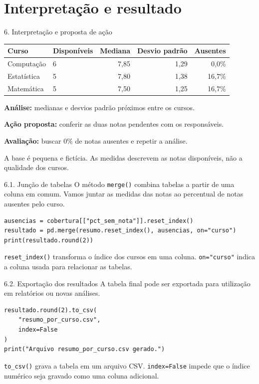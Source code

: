 \section{Interpretação e resultado}

\begin{frame}[t,label=cd-resultado]{6. Interpretação e proposta de ação}
\begin{tabularx}{\linewidth}{@{}lXrrr@{}}
\toprule
\textbf{Curso} & \textbf{Disponíveis} & \textbf{Mediana} & \textbf{Desvio padrão} & \textbf{Ausentes} \\
\midrule
Computação & 6 & 7,85 & 1,29 & 0,0\% \\
Estatística & 5 & 7,80 & 1,38 & 16,7\% \\
Matemática & 5 & 7,50 & 1,25 & 16,7\% \\
\bottomrule
\end{tabularx}
\smallskip

\textbf{Análise:} medianas e desvios padrão próximos entre os cursos.

\textbf{Ação proposta:} conferir as duas notas pendentes com os responsáveis.

\textbf{Avaliação:} buscar 0\% de notas ausentes e repetir a análise.

\begin{EMASCnote}
A base é pequena e fictícia. As medidas descrevem as notas disponíveis, não a qualidade dos cursos.
\end{EMASCnote}
\end{frame}

\begin{frame}[fragile,t]{6.1. Junção de tabelas}
O método \texttt{merge()} combina tabelas a partir de uma coluna em comum. Vamos juntar as medidas das notas ao percentual de notas ausentes pelo curso.
\begin{lstlisting}
ausencias = cobertura[["pct_sem_nota"]].reset_index()
resultado = pd.merge(resumo.reset_index(), ausencias, on="curso")
print(resultado.round(2))
\end{lstlisting}
\begin{EMASCnote}
\texttt{reset\_index()} transforma o índice dos cursos em uma coluna. \texttt{on="curso"} indica a coluna usada para relacionar as tabelas.
\end{EMASCnote}
\end{frame}

\begin{frame}[fragile,t]{6.2. Exportação dos resultados}
A tabela final pode ser exportada para utilização em relatórios ou novas análises.
\begin{lstlisting}
resultado.round(2).to_csv(
    "resumo_por_curso.csv",
    index=False
)
print("Arquivo resumo_por_curso.csv gerado.")
\end{lstlisting}
\begin{EMASCnote}
\texttt{to\_csv()} grava a tabela em um arquivo CSV. \texttt{index=False} impede que o índice numérico seja gravado como uma coluna adicional.
\end{EMASCnote}
\end{frame}
